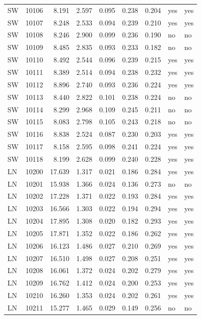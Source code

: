 \begin{longtable}{@{}llrrrrrll@{}}
SW & 10106 & 8.191 & 2.597 & 0.095 & 0.238 & 0.204 & yes & yes\\
SW & 10107 & 8.248 & 2.533 & 0.094 & 0.239 & 0.210 & yes & yes\\
SW & 10108 & 8.246 & 2.900 & 0.099 & 0.236 & 0.190 & no & no\\
SW & 10109 & 8.485 & 2.835 & 0.093 & 0.233 & 0.182 & no & no\\
SW & 10110 & 8.492 & 2.544 & 0.096 & 0.239 & 0.215 & yes & yes\\
SW & 10111 & 8.389 & 2.514 & 0.094 & 0.238 & 0.232 & yes & yes\\
SW & 10112 & 8.896 & 2.740 & 0.093 & 0.236 & 0.224 & yes & yes\\
SW & 10113 & 8.440 & 2.822 & 0.101 & 0.238 & 0.224 & no & no\\
SW & 10114 & 8.299 & 2.968 & 0.109 & 0.245 & 0.211 & no & no\\
SW & 10115 & 8.083 & 2.798 & 0.105 & 0.243 & 0.218 & no & no\\
SW & 10116 & 8.838 & 2.524 & 0.087 & 0.230 & 0.203 & yes & yes\\
SW & 10117 & 8.158 & 2.595 & 0.098 & 0.241 & 0.224 & yes & yes\\
SW & 10118 & 8.199 & 2.628 & 0.099 & 0.240 & 0.228 & yes & yes\\
LN & 10200 & 17.639 & 1.317 & 0.021 & 0.186 & 0.284 & yes & yes\\
LN & 10201 & 15.938 & 1.366 & 0.024 & 0.136 & 0.273 & no & no\\
LN & 10202 & 17.228 & 1.371 & 0.022 & 0.193 & 0.284 & yes & yes\\
LN & 10203 & 16.566 & 1.303 & 0.022 & 0.194 & 0.294 & yes & yes\\
LN & 10204 & 17.895 & 1.308 & 0.020 & 0.182 & 0.293 & yes & yes\\
LN & 10205 & 17.871 & 1.352 & 0.022 & 0.186 & 0.262 & yes & yes\\
LN & 10206 & 16.123 & 1.486 & 0.027 & 0.210 & 0.269 & yes & yes\\
LN & 10207 & 16.510 & 1.498 & 0.027 & 0.208 & 0.251 & yes & yes\\
LN & 10208 & 16.061 & 1.372 & 0.024 & 0.202 & 0.279 & yes & yes\\
LN & 10209 & 16.762 & 1.412 & 0.024 & 0.200 & 0.253 & yes & yes\\
LN & 10210 & 16.260 & 1.353 & 0.024 & 0.202 & 0.261 & yes & yes\\
LN & 10211 & 15.277 & 1.465 & 0.029 & 0.149 & 0.256 & no & no\\

\end{longtable}
